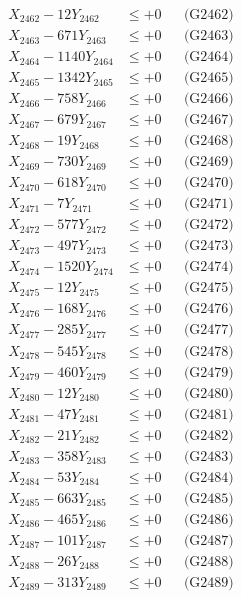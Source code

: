 \documentclass[a4paper,10pt]{article}
\begin{document}
{\begin{align}
X_{2462} - 12Y_{2462} &\leq +0 && \text{(G2462)} \\
X_{2463} - 671Y_{2463} &\leq +0 && \text{(G2463)} \\
X_{2464} - 1140Y_{2464} &\leq +0 && \text{(G2464)} \\
X_{2465} - 1342Y_{2465} &\leq +0 && \text{(G2465)} \\
X_{2466} - 758Y_{2466} &\leq +0 && \text{(G2466)} \\
X_{2467} - 679Y_{2467} &\leq +0 && \text{(G2467)} \\
X_{2468} - 19Y_{2468} &\leq +0 && \text{(G2468)} \\
X_{2469} - 730Y_{2469} &\leq +0 && \text{(G2469)} \\
X_{2470} - 618Y_{2470} &\leq +0 && \text{(G2470)} \\
\allowbreak
X_{2471} - 7Y_{2471} &\leq +0 && \text{(G2471)} \\
X_{2472} - 577Y_{2472} &\leq +0 && \text{(G2472)} \\
X_{2473} - 497Y_{2473} &\leq +0 && \text{(G2473)} \\
X_{2474} - 1520Y_{2474} &\leq +0 && \text{(G2474)} \\
X_{2475} - 12Y_{2475} &\leq +0 && \text{(G2475)} \\
X_{2476} - 168Y_{2476} &\leq +0 && \text{(G2476)} \\
X_{2477} - 285Y_{2477} &\leq +0 && \text{(G2477)} \\
X_{2478} - 545Y_{2478} &\leq +0 && \text{(G2478)} \\
X_{2479} - 460Y_{2479} &\leq +0 && \text{(G2479)} \\
X_{2480} - 12Y_{2480} &\leq +0 && \text{(G2480)} \\
\allowbreak
X_{2481} - 47Y_{2481} &\leq +0 && \text{(G2481)} \\
X_{2482} - 21Y_{2482} &\leq +0 && \text{(G2482)} \\
X_{2483} - 358Y_{2483} &\leq +0 && \text{(G2483)} \\
X_{2484} - 53Y_{2484} &\leq +0 && \text{(G2484)} \\
X_{2485} - 663Y_{2485} &\leq +0 && \text{(G2485)} \\
X_{2486} - 465Y_{2486} &\leq +0 && \text{(G2486)} \\
X_{2487} - 101Y_{2487} &\leq +0 && \text{(G2487)} \\
X_{2488} - 26Y_{2488} &\leq +0 && \text{(G2488)} \\
X_{2489} - 313Y_{2489} &\leq +0 && \text{(G2489)} \\

\end{align}}
\end{document}
